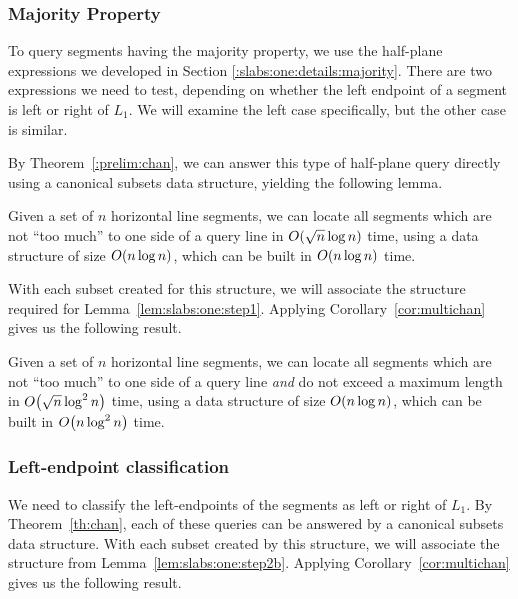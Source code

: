 \subsubsection{Majority Property}

To query segments having the majority property, we use the half-plane expressions we developed in Section \ref{:slabs:one:details:majority}.
There are two expressions we need to test, depending on whether the left endpoint of a segment is left or right of $L_1$.
We will examine the left case specifically, but the other case is similar.

By Theorem~\ref{:prelim:chan}, we can answer this type of half-plane query directly using a canonical subsets data structure, yielding the following lemma.

\begin{lemma}
\label{lem:slabs:one:step2a}
Given a set of $n$ horizontal line segments, we can locate all segments which are not ``too much'' to one side of a query line in $O\!\left(\sqrt{n}\log{n}\right)$ time, using a data structure of size $O\!\left(n\log{n}\right)$, which can be built in $O\!\left(n\log{n}\right)$ time.
\end{lemma}

With each subset created for this structure, we will associate the structure required for Lemma~\ref{lem:slabs:one:step1}.
Applying Corollary~\ref{cor:multichan} gives us the following result.

\begin{lemma}
\label{lem:slabs:one:step2b}
Given a set of $n$ horizontal line segments, we can locate all segments which are not ``too much'' to one side of a query line \emph{and} do not exceed a maximum length in $O\!\left(\sqrt{n}\log^2{n}\right)$ time, using a data structure of size $O\!\left(n\log{n}\right)$, which can be built in $O\!\left(n\log^2{n}\right)$ time.
\end{lemma}


\subsubsection{Left-endpoint classification}

We need to classify the left-endpoints of the segments as left or right of $L_1$. 
By Theorem~\ref{th:chan}, each of these queries can be answered by a canonical subsets data structure.
With each subset created by this structure, we will associate the structure from Lemma~\ref{lem:slabs:one:step2b}. 
Applying Corollary~\ref{cor:multichan} gives us the following result.

